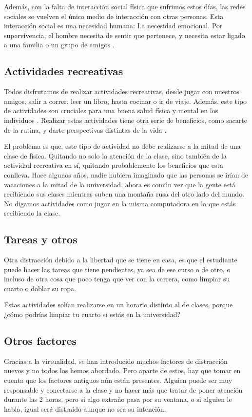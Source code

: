 Además, con la falta de interacción social física que sufrimos estos días, las redes sociales se vuelven el único medio de interacción con otras personas. Esta interacción social es una necesidad humana: La necesidad emocional. Por supervivencia, el hombre necesita de sentir que pertenece, y necesita estar ligado a una familia o un grupo de amigos \cite{EmotionalNeeds}.

\subsection{Actividades recreativas}
Todos disfrutamos de realizar actividades recreativas, desde jugar con nuestros amigos, salir a correr, leer un libro, hasta cocinar o ir de viaje. Además, este tipo de actividades son cruciales para una buena salud física y mental en los individuos \cite{Recre1}. Realizar estas actividades tiene otra serie de beneficios, como sacarte de la rutina, y darte perspectivas distintas de la vida \cite{Recre2}.

El problema es que, este tipo de actividad no debe realizarse a la mitad de una clase de física. Quitando no solo la atención de la clase, sino también de la actividad recreativa en sí, quitando probablemente los beneficios que esta conlleva. Hace algunos años, nadie hubiera imaginado que las personas se irían de vacaciones a la mitad de la universidad, ahora es común ver que la gente está recibiendo sus clases mientras suben una montaña rusa del otro lado del mundo. No digamos actividades como jugar en la misma computadora en la que estás recibiendo la clase.

\subsection{Tareas y otros}
Otra distracción debido a la libertad que se tiene en casa, es que el estudiante puede hacer las tareas que tiene pendientes, ya sea de ese curso o de otro, o incluso de otra cosa que poco tenga que ver con la carrera, como limpiar su cuarto o doblar su ropa. 

Estas actividades solían realizarse en un horario distinto al de clases, porque ¿cómo podrías limpiar tu cuarto si estás en la universidad?

\subsection{Otros factores}
Gracias a la virtualidad, se han introducido muchos factores de distracción nuevos y no todos los hemos abordado. Pero aparte de estos, hay que tomar en cuenta que los factores antiguos aún están presentes. Alguien puede ser muy responsable y conectarse a la clase y no hacer más que tratar de poner atención durante las 2 horas, pero si algo extraño pasa por su ventana, o si alguien le habla, igual será distraído aunque no sea su intención.

